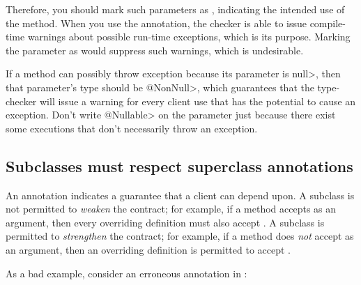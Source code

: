 Therefore, you should mark such parameters as
, indicating
the intended use of the method.  When you use the 
annotation, the checker is able to issue compile-time warnings about
possible run-time exceptions, which is its purpose.  Marking the parameter
as  would suppress such warnings, which is undesirable.

If a method can possibly throw exception because its parameter
is \<null>, then that parameter's type should be \<@NonNull>, which
guarantees that the type-checker will issue a warning for every client
use that has the potential to cause an exception.  Don't write
\<@Nullable> on the parameter just because there exist some executions that
don't necessarily throw an exception.



\subsection{Subclasses must respect superclass annotations\label{annotations-are-a-contract}}

An annotation indicates a guarantee that a client can depend upon.  A subclass
is not permitted to \emph{weaken} the contract; for example,
if a method accepts  as an argument, then every overriding
definition must also accept .
A subclass is permitted to \emph{strengthen} the contract; for example,
if a method does \emph{not} accept  as an argument, then an
overriding definition is permitted to accept .

\begin{sloppypar}
As a bad example, consider an erroneous  annotation in
\href{https://github.com/google/guava/blob/master/guava/src/com/google/common/collect/Multiset.java\#L129}{}:
\end{sloppypar}


